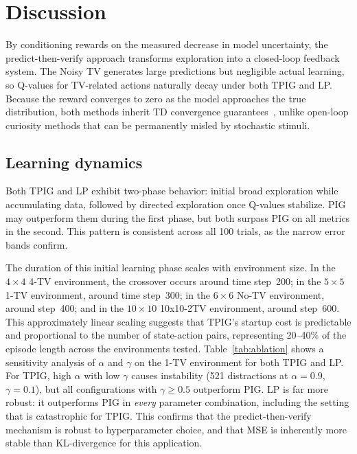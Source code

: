 \documentclass[letterpaper]{article}
\begin{document}
\section{Discussion}

By conditioning rewards on the measured decrease in model uncertainty,
the predict-then-verify approach transforms exploration into a
closed-loop feedback system.  The Noisy TV generates large predictions
but negligible actual learning, so Q-values for TV-related actions
naturally decay under both TPIG and LP.  Because the reward converges
to zero as the model approaches the true distribution, both methods
inherit TD convergence guarantees~\citep{Sutton1998}, unlike open-loop
curiosity methods that can be permanently misled by stochastic stimuli.

\subsection{Learning dynamics}

Both TPIG and LP exhibit two-phase behavior: initial broad exploration
while accumulating data, followed by directed exploration once Q-values
stabilize.  PIG may outperform them during the first phase, but both
surpass PIG on all metrics in the second.  This pattern is consistent
across all 100 trials, as the narrow error bands confirm.

The duration of this initial learning phase scales with environment
size.  In the $4 \times 4$ 4-TV environment, the crossover occurs
around time step~200; in the $5 \times 5$ 1-TV environment, around
time step~300; in the $6 \times 6$ No-TV environment, around step~400;
and in the $10 \times 10$ 10x10-2TV environment, around step~600.  This approximately linear scaling suggests that TPIG's
startup cost is predictable and proportional to the number of
state-action pairs, representing 20--40\% of the episode length across the environments
tested.
Table~\ref{tab:ablation} shows a sensitivity analysis of $\alpha$ and
$\gamma$ on the 1-TV environment for both TPIG and LP.  For TPIG,
high $\alpha$ with low $\gamma$ causes instability (521 distractions
at $\alpha{=}0.9$, $\gamma{=}0.1$), but all configurations with
$\gamma \geq 0.5$ outperform PIG.  LP is far more robust: it
outperforms PIG in \emph{every} parameter combination, including the
setting that is catastrophic for TPIG.  This confirms that the
predict-then-verify mechanism is robust to hyperparameter choice, and
that MSE is inherently more stable than KL-divergence for this
application.
\end{document}
